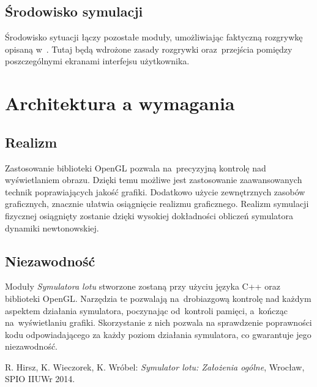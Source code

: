 \documentclass{mwrep}
\begin{document}
\section{Środowisko symulacji}
Środowisko sytuacji łączy pozostałe moduły, umożliwiając faktyczną rozgrywkę opisaną w~\cite{zalozenia}. Tutaj będą wdrożone zasady rozgrywki oraz~przejścia pomiędzy poszczególnymi ekranami interfejsu użytkownika.

\chapter{Architektura a wymagania}

\section{Realizm}
Zastosowanie biblioteki OpenGL pozwala na~precyzyjną kontrolę nad wyświetlaniem obrazu. Dzięki temu możliwe jest zastosowanie zaawansowanych technik poprawiających jakość grafiki. Dodatkowo użycie zewnętrznych zasobów graficznych, znacznie ułatwia osiągnięcie realizmu graficznego. Realizm symulacji fizycznej osiągnięty zostanie dzięki wysokiej dokładności obliczeń symulatora dynamiki newtonowskiej.

\section{Niezawodność}
Moduły \textit{Symulatora lotu} stworzone zostaną przy użyciu języka C++ oraz biblioteki OpenGL. Narzędzia te pozwalają na~drobiazgową kontrolę nad każdym aspektem działania symulatora, poczynając od~kontroli pamięci, a~kończąc na~wyświetlaniu grafiki. Skorzystanie z nich pozwala na \linebreak sprawdzenie poprawności kodu odpowiadającego za każdy poziom działania symulatora, co gwarantuje jego niezawodność.

\begin{thebibliography}{9}
     R. Hirsz, K. Wieczorek, K. Wróbel: \textit{Symulator lotu: Założenia ogólne}, Wrocław, SPIO IIUWr 2014.
\end{thebibliography}
\end{document}
